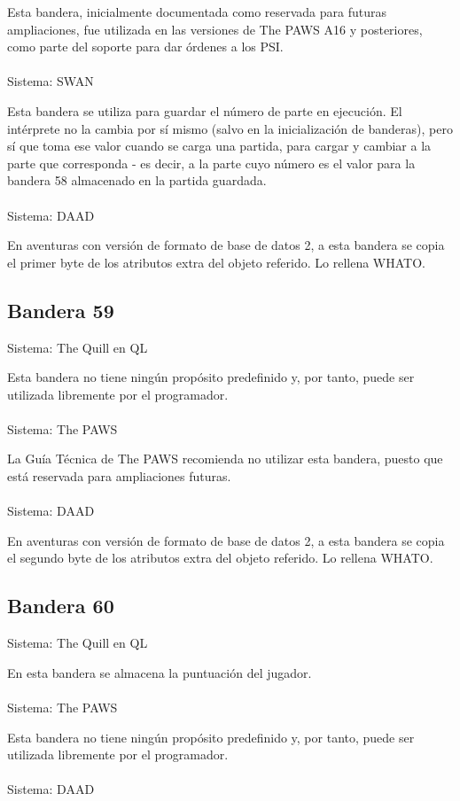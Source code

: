 \documentclass[11pt, a5paper]{article}
\newcommand{\quill}{\textsf{The Quill}\xspace}
\newcommand{\paw}{\textsf{The PAWS}\xspace}
\newcommand{\swan}{\textsf{SWAN}\xspace}
\newcommand{\daad}{\textsf{DAAD}\xspace}
\newcommand{\sistema}[1]{\noindent Sistema: #1 \nopagebreak}
\begin{document}
Esta bandera, inicialmente documentada como reservada para futuras ampliaciones, fue utilizada en las versiones de \paw A16 y posteriores, como parte del soporte para dar órdenes a los PSI. \cite{PawsSupl}
\\\ \\
\sistema{\swan}

Esta bandera se utiliza para guardar el número de parte en ejecución. El intérprete no la cambia por sí mismo (salvo en la inicialización de banderas), pero sí que toma ese valor cuando se carga una partida, para cargar y cambiar a la parte que corresponda - es decir, a la parte cuyo número es el valor para la bandera 58 almacenado en la partida guardada.
\\\ \\
\sistema{\daad}

En aventuras con versión de formato de base de datos 2, a esta bandera se copia el primer byte de los atributos extra del objeto referido. Lo rellena WHATO.

\subsection{Bandera 59}

\sistema{\quill en QL}

Esta bandera no tiene ningún propósito predefinido y, por tanto, puede ser utilizada libremente por el programador.
\\\ \\
\sistema{\paw}

La Guía Técnica de \paw \cite{PawsZX} recomienda no utilizar esta bandera, puesto que está reservada para ampliaciones futuras.
\\\ \\
\sistema{\daad}

En aventuras con versión de formato de base de datos 2, a esta bandera se copia el segundo byte de los atributos extra del objeto referido. Lo rellena WHATO.

\subsection{Bandera 60}\label{flag60}

\sistema{\quill en QL}

En esta bandera se almacena la puntuación del jugador.
\\\ \\
\sistema{\paw}

Esta bandera no tiene ningún propósito predefinido y, por tanto, puede ser utilizada libremente por el programador.
\\\ \\
\sistema{\daad}
\end{document}
